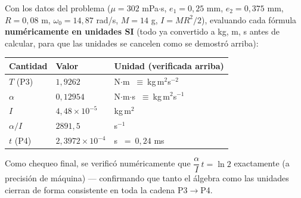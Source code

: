 \documentclass[11pt]{article}
\begin{document}
Con los datos del problema ($\mu=302$ mPa$\cdot$s, $e_1=0{,}25$ mm, $e_2=0{,}375$ mm,
$R=0{,}08$ m, $\omega_0=14{,}87$ rad/s, $M=14$ g, $I=MR^2/2$), evaluando cada
f\'ormula \textbf{num\'ericamente en unidades SI} (todo ya convertido a kg, m, s antes
de calcular, para que las unidades se cancelen como se demostr\'o arriba):

\begin{center}
\begin{tabular}{@{}lll@{}}
\toprule
Cantidad & Valor & Unidad (verificada arriba) \\
\midrule
$T$ (P3) & $1{,}9262$ & N$\cdot$m $\ \equiv\ $kg$\,$m$^2$s$^{-2}$ \\
$\alpha$ & $0{,}12954$ & N$\cdot$m$\cdot$s $\ \equiv\ $kg$\,$m$^2$s$^{-1}$ \\
$I$ & $4{,}48\times10^{-5}$ & kg$\,$m$^2$ \\
$\alpha/I$ & $2891{,}5$ & s$^{-1}$ \\
$t$ (P4) & $2{,}3972\times10^{-4}$ & s $\ =\ 0{,}24$ ms \\
\bottomrule
\end{tabular}
\end{center}

Como chequeo final, se verific\'o num\'ericamente que $\dfrac{\alpha}{I}\,t=\ln 2$
exactamente (a precisi\'on de m\'aquina) --- confirmando que tanto el \'algebra como
las unidades cierran de forma consistente en toda la cadena P3$\to$P4.

\vspace{4pt}
\end{document}
